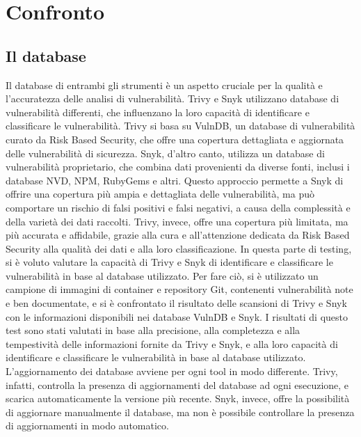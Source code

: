 \chapter{Confronto}
\section{Il database}
Il database di entrambi gli strumenti è un aspetto cruciale per la qualità e l'accuratezza delle analisi di vulnerabilità. Trivy e Snyk utilizzano database di vulnerabilità differenti, che influenzano la loro capacità di identificare e classificare le vulnerabilità. Trivy si basa su VulnDB, un database di vulnerabilità curato da Risk Based Security, che offre una copertura dettagliata e aggiornata delle vulnerabilità di sicurezza. Snyk, d'altro canto, utilizza un database di vulnerabilità proprietario, che combina dati provenienti da diverse fonti, inclusi i database NVD, NPM, RubyGems e altri. Questo approccio permette a Snyk di offrire una copertura più ampia e dettagliata delle vulnerabilità, ma può comportare un rischio di falsi positivi e falsi negativi, a causa della complessità e della varietà dei dati raccolti. Trivy, invece, offre una copertura più limitata, ma più accurata e affidabile, grazie alla cura e all'attenzione dedicata da Risk Based Security alla qualità dei dati e alla loro classificazione.
In questa parte di testing, si è voluto valutare la capacità di Trivy e Snyk di identificare e classificare le vulnerabilità in base al database utilizzato. Per fare ciò, si è utilizzato un campione di immagini di container e repository Git, contenenti vulnerabilità note e ben documentate, e si è confrontato il risultato delle scansioni di Trivy e Snyk con le informazioni disponibili nei database VulnDB e Snyk. I risultati di questo test sono stati valutati in base alla precisione, alla completezza e alla tempestività delle informazioni fornite da Trivy e Snyk, e alla loro capacità di identificare e classificare le vulnerabilità in base al database utilizzato.
L'aggiornamento dei database avviene per ogni tool in modo differente. Trivy, infatti, controlla la presenza di aggiornamenti del database ad ogni esecuzione, e scarica automaticamente la versione più recente. Snyk, invece, offre la possibilità di aggiornare manualmente il database, ma non è possibile controllare la presenza di aggiornamenti in modo automatico.

